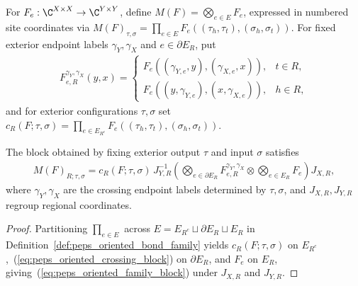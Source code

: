 \begin{definition}%
    \label{def:peps_oriented_bond_family}
    \leanok
    For $F_e:\C^{X\times X}\to\C^{Y\times Y}$, define
    $M(F)=\bigotimes_{e\in E}F_e$, expressed in numbered site coordinates via
    $M(F)_{\tau,\sigma}=\prod_{e\in E}F_e((\tau_h,\tau_t),(\sigma_h,\sigma_t))$.
    For fixed exterior endpoint labels $\gamma_Y,\gamma_X$ and $e\in\partial E_R$, put
    \begin{align}
        F_{e,R}^{\gamma_Y,\gamma_X}(y,x)
        =\begin{cases}
             F_e((\gamma_{Y,e},y),(\gamma_{X,e},x)), & t\in R, \\
             F_e((y,\gamma_{Y,e}),(x,\gamma_{X,e})), & h\in R,
         \end{cases}
        \label{eq:peps_oriented_crossing_block}
    \end{align}
    and for exterior configurations $\tau,\sigma$ set
    $c_R(F;\tau,\sigma)=\prod_{e\in E_{R^c}}F_e((\tau_h,\tau_t),(\sigma_h,\sigma_t))$.
\end{definition}

\begin{lemma}%
    \label{thm:peps_oriented_bond_family_blocks}
    \leanok
    The block obtained by fixing exterior output $\tau$ and input
    $\sigma$ satisfies
    \begin{align}
        M(F)_{R;\tau,\sigma}
        =c_R(F;\tau,\sigma)\,
        J_{Y,R}^{-1}\left(
        \bigotimes_{e\in\partial E_R}F_{e,R}^{\gamma_Y,\gamma_X}
        \otimes\bigotimes_{e\in E_R}F_e\right)J_{X,R},
        \label{eq:peps_oriented_family_block}
    \end{align}
    where $\gamma_Y,\gamma_X$ are the crossing endpoint labels determined
    by $\tau,\sigma$, and $J_{X,R},J_{Y,R}$ regroup regional coordinates.
\end{lemma}
\begin{proof}\leanok
    Partitioning $\prod_{e\in E}$ across $E=E_{R^c}\sqcup\partial E_R\sqcup E_R$
    in Definition~\ref{def:peps_oriented_bond_family} yields $c_R(F;\tau,\sigma)$
    on $E_{R^c}$,~(\ref{eq:peps_oriented_crossing_block}) on $\partial E_R$,
    and $F_e$ on $E_R$, giving~(\ref{eq:peps_oriented_family_block}) under
    $J_{X,R}$ and $J_{Y,R}$.
\end{proof}

